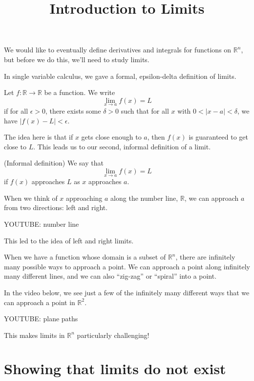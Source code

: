 \documentclass{ximera}
\title{Introduction to Limits}
\begin{document}
\begin{abstract}
\end{abstract}
\maketitle

We would like to eventually define derivatives and integrals for functions on $\mathbb{R}^n$, but before we do this, we'll need to study limits.

In single variable calculus, we gave a formal, epsilon-delta definition of limits.

\begin{definition}
Let $f:\mathbb{R}\rightarrow\mathbb{R}$ be a function. We write
\[
\lim_{x\rightarrow a} f(x) = L
\]
if for all $\epsilon >0$, there exists some $\delta >0$ such that for all $x$ with $0 < |x-a| < \delta$, we have $|f(x)-L| < \epsilon$.
\end{definition}

The idea here is that if $x$ gets close enough to $a$, then $f(x)$ is guaranteed to get close to $L$. This leads us to our second, informal definition of a limit.

\begin{definition}
(Informal definition) We say that
\[
\lim_{x\rightarrow a} f(x) = L
\]
if $f(x)$ approaches $L$ as $x$ approaches $a$.
\end{definition}

When we think of $x$ approaching $a$ along the number line, $\mathbb{R}$, we can approach $a$ from two directions: left and right.

YOUTUBE: number line

This led to the idea of left and right limits.

When we have a function whose domain is a subset of $\mathbb{R}^n$, there are infinitely many possible ways to approach a point. We can approach a point along infinitely many different lines, and we can also ``zig-zag'' or ``spiral'' into a point.

In the video below, we see just a few of the infinitely many different ways that we can approach a point in $\mathbb{R}^2$.

YOUTUBE: plane paths

This makes limits in $\mathbb{R}^n$ particularly challenging!

\section*{Showing that limits do not exist}
\end{document}

